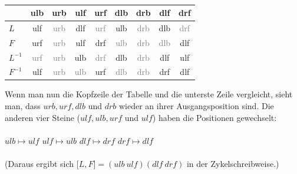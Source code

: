 \documentclass[12pt,a4paper, usenames, dvipsnames]{article}
\begin{document}
\begin{table}[H]
\centering
\begin{tabular}{|l|c|c|c|c|c|c|c|c|}
\hline
 & ulb & urb & ulf & urf & dlb & drb & dlf & drf \\
\hline
\hline
$L$ & ulf & \textcolor{gray}{urb} & dlf & \textcolor{gray}{urf} & ulb & \textcolor{gray}{drb} & dlb & \textcolor{gray}{drf} \\
\hline
$F$ & urf & \textcolor{gray}{urb} & ulf &  drf & \textcolor{gray}{ulb} & \textcolor{gray}{drb} & \textcolor{gray}{dlb} & dlf \\
\hline
$L^{-1}$ & \textcolor{gray}{urf} & \textcolor{gray}{urb} & ulb & \textcolor{gray}{drf} & dlb & \textcolor{gray}{drb} & dlf & ulf \\
\hline
$F^{-1}$ & ulf & \textcolor{gray}{urb} & \textcolor{gray}{ulb} & urf & \textcolor{gray}{dlb} & \textcolor{gray}{drb} & drf & dlf\\
\hline
\end{tabular}
\caption[Permutationen von $\lbrack L, F \rbrack $]{ }
\end{table}

Wenn man nun die Kopfzeile der Tabelle und die unterste Zeile vergleicht, sieht man, dass $urb, urf, dlb$ und $drb$ wieder an ihrer Ausgangsposition sind. Die anderen vier Steine ($ulf, ulb, urf$ und $ulf$) haben die Positionen gewechselt: \\
\\
$ulb \mapsto ulf$ \hspace*{2.5cm }$ulf  \mapsto ulb$ \hspace*{2.5cm } $dlf \mapsto drf$ \hspace*{2.5cm } $drf \mapsto dlf$
\\
\\
(Daraus ergibt sich $\lbrack L, F \rbrack  = (ulb \ ulf)(dlf \ drf)$ in der Zykelschreibweise.)













\end{document}
